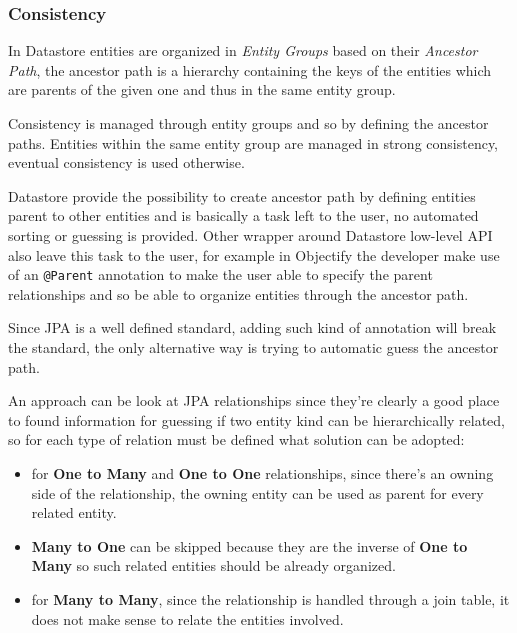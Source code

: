 \subsubsection{Consistency}
In Datastore entities are organized in \textit{Entity Groups} based on their \textit{Ancestor Path}, the ancestor path is a hierarchy containing the keys of the entities which are parents of the given one and thus in the same entity group.

\noindent Consistency is managed through entity groups and so by defining the ancestor paths. Entities within the same entity group are managed in strong consistency, eventual consistency is used otherwise.

\noindent Datastore provide the possibility to create ancestor path by defining entities parent to other entities and is basically a task left to the user, no automated sorting or guessing is provided. Other wrapper around Datastore low-level API also leave this task to the user, for example in Objectify \cite{online:objectify} the developer make use of an \texttt{@Parent} annotation to make the user able to specify the parent relationships and so be able to organize entities through the ancestor path.

\noindent Since JPA is a well defined standard, adding such kind of annotation will break the standard, the only alternative way is trying to automatic guess the ancestor path.

\newparagraph An approach can be look at JPA relationships since they're clearly a good place to found information for guessing if two entity kind can be hierarchically related, so for each type of relation must be defined what solution can be adopted:
\begin{itemize}
\item for \textbf{One to Many} and \textbf{One to One} relationships, since there's an owning side of the relationship, the owning entity can be used as parent for every related entity. 
\item \textbf{Many to One} can be skipped because they are the inverse of \textbf{One to Many} so such related entities should be already organized. 
\item for \textbf{Many to Many}, since the relationship is handled through a join table, it does not make sense to relate the entities involved.
\end{itemize}

